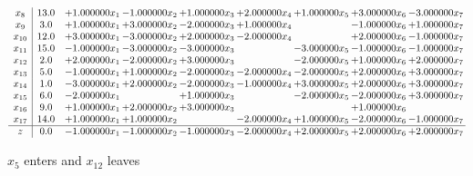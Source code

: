 \documentclass[10pt]{article}
\begin{document}
\[\begin{array}{c| c c@{\hskip 2pt} c@{\hskip 2pt} c@{\hskip 2pt} c@{\hskip 2pt} c@{\hskip 2pt} c@{\hskip 2pt} c@{\hskip 2pt} }
 x_{8}   &  13.0 & + 1.000000 x_{1} & -1.000000 x_{2} & + 1.000000 x_{3} & + 2.000000 x_{4} & + 1.000000 x_{5} & + 3.000000 x_{6} & -3.000000 x_{7}\\
 x_{9}   &  3.0 & + 1.000000 x_{1} & + 3.000000 x_{2} & -2.000000 x_{3} & + 1.000000 x_{4} &   & -1.000000 x_{6} & + 1.000000 x_{7}\\
 x_{10}   &  12.0 & + 3.000000 x_{1} & -3.000000 x_{2} & + 2.000000 x_{3} & -2.000000 x_{4} &   & + 2.000000 x_{6} & -1.000000 x_{7}\\
 x_{11}   &  15.0 & -1.000000 x_{1} & -3.000000 x_{2} & -3.000000 x_{3} &   & -3.000000 x_{5} & -1.000000 x_{6} & -1.000000 x_{7}\\
 x_{12}   &  2.0 & + 2.000000 x_{1} & -2.000000 x_{2} & + 3.000000 x_{3} &   & -2.000000 x_{5} & + 1.000000 x_{6} & + 2.000000 x_{7}\\
 x_{13}   &  5.0 & -1.000000 x_{1} & + 1.000000 x_{2} & -2.000000 x_{3} & -2.000000 x_{4} & -2.000000 x_{5} & + 2.000000 x_{6} & + 3.000000 x_{7}\\
 x_{14}   &  1.0 & -3.000000 x_{1} & + 2.000000 x_{2} & -2.000000 x_{3} & -1.000000 x_{4} & + 3.000000 x_{5} & + 2.000000 x_{6} & + 3.000000 x_{7}\\
 x_{15}   &  6.0 & -2.000000 x_{1} &   & + 1.000000 x_{3} &   & -2.000000 x_{5} & -2.000000 x_{6} & + 3.000000 x_{7}\\
 x_{16}   &  9.0 & + 1.000000 x_{1} & + 2.000000 x_{2} & + 3.000000 x_{3} &    &   & + 1.000000 x_{6} &   \\
 x_{17}   &  14.0 & + 1.000000 x_{1} & + 1.000000 x_{2} &   & -2.000000 x_{4} & + 1.000000 x_{5} & -2.000000 x_{6} & -1.000000 x_{7}\\
\hline
z    &  0.0 & -1.000000 x_{1} & -1.000000 x_{2} & -1.000000 x_{3} & -2.000000 x_{4} & + 2.000000 x_{5} & + 2.000000 x_{6} & + 2.000000 x_{7}\\
\end{array}\]


 $ x_{5} $ enters and $ x_{12} $ leaves 
\end{document}
